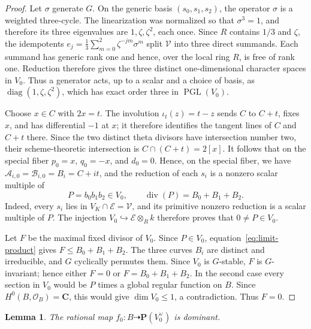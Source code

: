 \documentclass[12pt]{amsart}
\numberwithin{equation}{section}
\newtheorem{lemma}[theorem]{Lemma}
\theoremstyle{definition}
\theoremstyle{remark}
\newcommand{\C}{\mathbf C}
\newcommand{\PP}{\mathbf P}
\begin{document}
\begin{proof}
Let $\sigma$ generate $G$.  On the generic basis
$(s_0,s_1,s_2)$, the operator $\sigma$ is a weighted three-cycle.  The
linearization was normalized so that $\sigma^3=1$, and therefore its
three eigenvalues are $1,\zeta,\zeta^2$, each once.  Since
$R$ contains $1/3$ and $\zeta$, the idempotents
$e_j=\frac13\sum_{m=0}^2\zeta^{-jm}\sigma^m$ split
$\mathscr V$ into three direct summands.  Each summand has generic rank
one and hence, over the local ring $R$, is free of rank one.  Reduction
therefore gives the three distinct one-dimensional character spaces in
$V_0$.  Thus a generator acts, up to a scalar and a choice of basis, as
$\operatorname{diag}(1,\zeta,\zeta^2)$, which has exact order three in
$\operatorname{PGL}(V_0)$.

Choose $x\in C$ with $2x=t$.
The involution $\iota_t(z)=t-z$ sends $C$ to $C+t$, fixes $x$, and has
differential $-1$ at $x$; it therefore identifies the tangent lines of
$C$ and $C+t$ there.  Since the two distinct theta divisors have
intersection number two, their scheme-theoretic intersection is
$C\cap(C+t)=2[x]$.
It follows that on
the special fiber $p_0=x$, $q_0=-x$, and $d_0=0$.  Hence, on the special
fiber, we have
$\mathscr A_{i,0}=\mathscr B_{i,0}=B_i=C+it$, and the reduction of each
$s_i$ is a nonzero scalar multiple of
\begin{equation}
 P=b_0b_1b_2\in V_0,\qquad \operatorname{div}(P)=B_0+B_1+B_2.
\label{eq:limit-product}
\end{equation}
Indeed, every $s_i$ lies in
$V_K\cap\mathscr E=\mathscr V$, and its primitive nonzero reduction is
a scalar multiple of $P$.  The injection
$V_0\hookrightarrow\mathscr E\otimes_Rk$ therefore proves that
$0\ne P\in V_0$.

Let $F$ be the maximal fixed divisor of $V_0$.  Since $P\in V_0$,
equation~\eqref{eq:limit-product} gives $F\leq B_0+B_1+B_2$.  The three
curves $B_i$ are distinct and irreducible, and $G$ cyclically permutes
them.  Since $V_0$ is $G$-stable, $F$ is $G$-invariant; hence either
$F=0$ or $F=B_0+B_1+B_2$.  In the second case every section in $V_0$
would be $P$ times a global regular function on $B$.  Since
$H^0(B,\mathcal O_B)=\C$, this would give $\dim V_0\leq1$, a
contradiction.  Thus $F=0$.
\end{proof}

\begin{lemma}\label{lem:13-limit-dominant}
The rational map $f_0:B\dashrightarrow\PP(V_0^\vee)$ is dominant.
\end{lemma}
\end{document}
